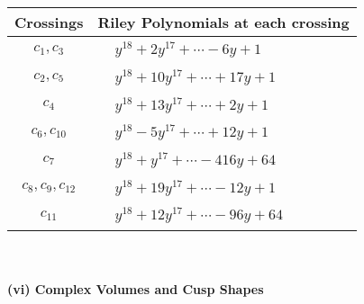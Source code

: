 \documentclass[1p]{elsarticle_modified}
\theoremstyle{definition}
\begin{document}
\begin{tabular}{m{50pt}|m{274pt}}
Crossings & \hspace{64pt}Riley Polynomials at each crossing \\
\hline $$\begin{aligned}c_{1},c_{3}\end{aligned}$$&$\begin{aligned}
&y^{18}+2 y^{17}+\cdots-6 y+1
\end{aligned}$\\
\hline $$\begin{aligned}c_{2},c_{5}\end{aligned}$$&$\begin{aligned}
&y^{18}+10 y^{17}+\cdots+17 y+1
\end{aligned}$\\
\hline $$\begin{aligned}c_{4}\end{aligned}$$&$\begin{aligned}
&y^{18}+13 y^{17}+\cdots+2 y+1
\end{aligned}$\\
\hline $$\begin{aligned}c_{6},c_{10}\end{aligned}$$&$\begin{aligned}
&y^{18}-5 y^{17}+\cdots+12 y+1
\end{aligned}$\\
\hline $$\begin{aligned}c_{7}\end{aligned}$$&$\begin{aligned}
&y^{18}+y^{17}+\cdots-416 y+64
\end{aligned}$\\
\hline $$\begin{aligned}c_{8},c_{9},c_{12}\end{aligned}$$&$\begin{aligned}
&y^{18}+19 y^{17}+\cdots-12 y+1
\end{aligned}$\\
\hline $$\begin{aligned}c_{11}\end{aligned}$$&$\begin{aligned}
&y^{18}+12 y^{17}+\cdots-96 y+64
\end{aligned}$\\
\hline
\end{tabular}\\~\\
\newpage\flushleft \textbf{(vi) Complex Volumes and Cusp Shapes}
\end{document}
